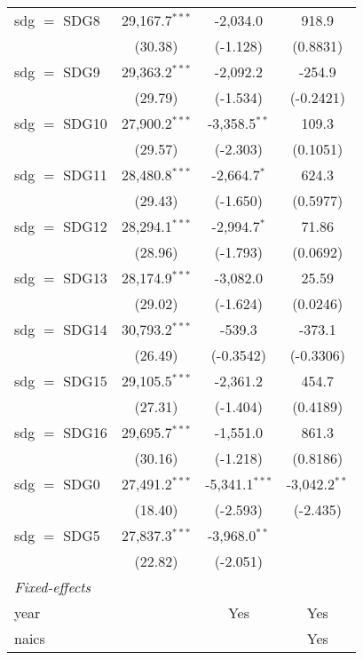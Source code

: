 \begin{tabular}{lccc}
   sdg $=$ SDG8  & 29,167.7$^{***}$ & -2,034.0         & 918.9\\   
                 & (30.38)          & (-1.128)         & (0.8831)\\   
   sdg $=$ SDG9  & 29,363.2$^{***}$ & -2,092.2         & -254.9\\   
                 & (29.79)          & (-1.534)         & (-0.2421)\\   
   sdg $=$ SDG10 & 27,900.2$^{***}$ & -3,358.5$^{**}$  & 109.3\\   
                 & (29.57)          & (-2.303)         & (0.1051)\\   
   sdg $=$ SDG11 & 28,480.8$^{***}$ & -2,664.7$^{*}$   & 624.3\\   
                 & (29.43)          & (-1.650)         & (0.5977)\\   
   sdg $=$ SDG12 & 28,294.1$^{***}$ & -2,994.7$^{*}$   & 71.86\\   
                 & (28.96)          & (-1.793)         & (0.0692)\\   
   sdg $=$ SDG13 & 28,174.9$^{***}$ & -3,082.0         & 25.59\\   
                 & (29.02)          & (-1.624)         & (0.0246)\\   
   sdg $=$ SDG14 & 30,793.2$^{***}$ & -539.3           & -373.1\\   
                 & (26.49)          & (-0.3542)        & (-0.3306)\\   
   sdg $=$ SDG15 & 29,105.5$^{***}$ & -2,361.2         & 454.7\\   
                 & (27.31)          & (-1.404)         & (0.4189)\\   
   sdg $=$ SDG16 & 29,695.7$^{***}$ & -1,551.0         & 861.3\\   
                 & (30.16)          & (-1.218)         & (0.8186)\\   
   sdg $=$ SDG0  & 27,491.2$^{***}$ & -5,341.1$^{***}$ & -3,042.2$^{**}$\\   
                 & (18.40)          & (-2.593)         & (-2.435)\\   
   sdg $=$ SDG5  & 27,837.3$^{***}$ & -3,968.0$^{**}$  &   \\   
                 & (22.82)          & (-2.051)         &   \\   
   \midrule
   \emph{Fixed-effects}\\
   year          &                  & Yes              & Yes\\  
   naics         &                  &                  & Yes\\  

\end{tabular}

